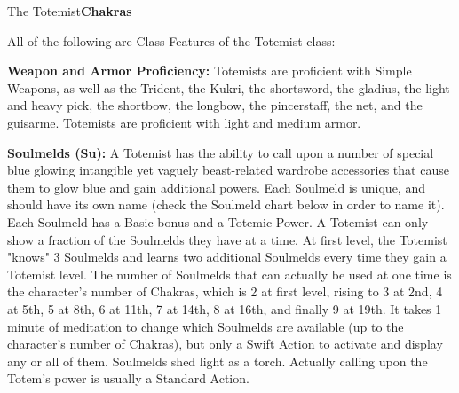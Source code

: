 \begin{extraclasstable}{The Totemist}{\textbf{Chakras}}
\end{extraclasstable}

\ClassFeatures
All of the following are Class Features of the Totemist class:

\textbf{Weapon and Armor Proficiency:} Totemists are proficient with Simple Weapons, as well as the Trident, the Kukri, the shortsword, the gladius, the light and heavy pick, the shortbow, the longbow, the pincerstaff, the net, and the guisarme. Totemists are proficient with light and medium armor. 

\textbf{Soulmelds (Su):} A Totemist has the ability to call upon a number of special blue glowing intangible yet vaguely beast-related wardrobe accessories that cause them to glow blue and gain additional powers. Each Soulmeld is unique, and should have its own name (check the Soulmeld chart below in order to name it). Each Soulmeld has a Basic bonus and a Totemic Power. A Totemist can only show a fraction of the Soulmelds they have at a time. At first level, the Totemist "knows" 3 Soulmelds and learns two additional Soulmelds every time they gain a Totemist level. The number of Soulmelds that can actually be used at one time is the character's number of Chakras, which is 2 at first level, rising to 3 at 2nd, 4 at 5th, 5 at 8th, 6 at 11th, 7 at 14th, 8 at 16th, and finally 9 at 19th. It takes 1 minute of meditation to change which Soulmelds are available (up to the character's number of Chakras), but only a Swift Action to activate and display any or all of them. Soulmelds shed light as a torch. Actually calling upon the Totem's power is usually a Standard Action. 

